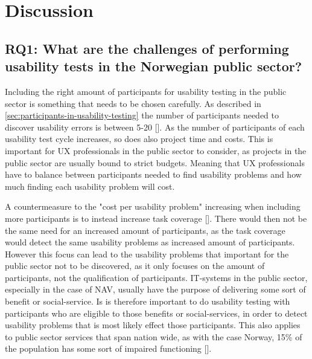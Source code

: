 \section{Discussion}

\subsection{RQ1: What are the challenges of performing usability tests in the Norwegian public sector?}
Including the right amount of participants for usability testing in the public sector is something that needs to be chosen carefully. As described in \autoref{sec:participants-in-usability-testing} the number of participants needed to discover usability errors is between 5-20 [\cite{ola_2019}]. As the number of participants of each usability test cycle increases, so does also project time and costs. This is important for UX professionals in the public sector to consider, as projects in the public sector are usually bound to strict budgets. Meaning that UX professionals have to balance between participants needed to find usability problems and how much finding each usability problem will cost.

A countermeasure to the "cost per usability problem" increasing when including more participants is to instead increase task coverage [\cite{gl_2007}]. There would then not be the same need for an increased amount of participants, as the task coverage would detect the same usability problems as increased amount of participants. However this focus can lead to the usability problems that important for the public sector not to be discovered, as it only focuses on the amount of participants, not the qualification of participants. IT-systems in the public sector, especially in the case of NAV, usually have the purpose of delivering some sort of benefit or social-service. Is is therefore important to do usability testing with participants who are eligible to those benefits or social-services, in order to detect usability problems that is most likely effect those participants. This also applies to public sector services that span nation wide, as with the case Norway, 15\% of the population has some sort of impaired functioning [\cite{nhf_2022}].

